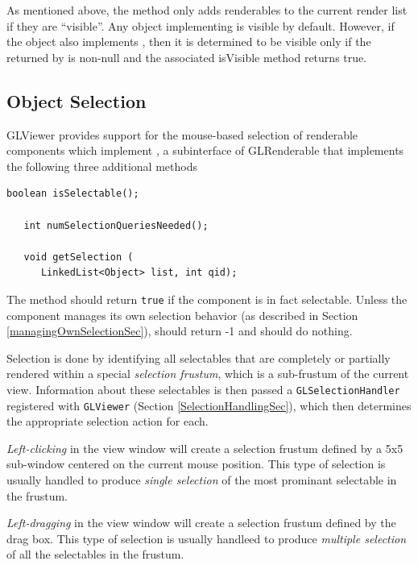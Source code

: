 \documentclass{article}
\begin{document}
As mentioned above, the  method
only adds renderables to the current render list if they are
``visible''.  Any object implementing  is
visible by default.  However, if the object also implements
, then it is determined to be visible only
if the  returned by 
 is non-null and the
associated isVisible method returns true.

\subsection{Object Selection}

GLViewer provides support for the mouse-based selection of renderable
components which implement , a subinterface of
GLRenderable that implements the following three additional methods
\begin{lstlisting}[]
   boolean isSelectable();

   int numSelectionQueriesNeeded();

   void getSelection (
      LinkedList<Object> list, int qid);

\end{lstlisting}
The method  should return 
{\tt true} if the component is in fact selectable.
Unless the component manages its own selection behavior 
(as described in Section \ref{managingOwnSelectionSec}), 
 should return -1
and  should do nothing.

Selection is done by identifying all selectables that are completely
or partially rendered within a special {\it selection frustum}, which
is a sub-frustum of the current view. Information about these
selectables is then passed a {\tt GLSelectionHandler}
registered with {\tt GLViewer} (Section \ref{SelectionHandlingSec}),
which then determines the appropriate selection action for each.


{\it Left-clicking} in the view window will create a selection frustum
defined by a 5x5 sub-window centered on the current mouse
position. This type of selection is usually handled to produce {\it
single selection} of the most prominant selectable in the frustum.

{\it Left-dragging} in the view window will create a selection frustum
defined by the drag box.  This type of selection is usually handleed
to produce {\it multiple selection} of all the selectables in the
frustum.
\end{document}
